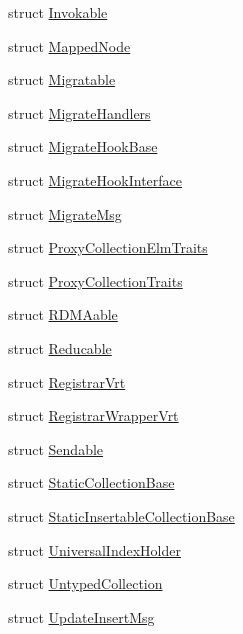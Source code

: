 \begin{DoxyCompactItemize}
\item 
struct \hyperlink{structvt_1_1vrt_1_1collection_1_1_invokable}{Invokable}
\item 
struct \hyperlink{structvt_1_1vrt_1_1collection_1_1_mapped_node}{Mapped\+Node}
\item 
struct \hyperlink{structvt_1_1vrt_1_1collection_1_1_migratable}{Migratable}
\item 
struct \hyperlink{structvt_1_1vrt_1_1collection_1_1_migrate_handlers}{Migrate\+Handlers}
\item 
struct \hyperlink{structvt_1_1vrt_1_1collection_1_1_migrate_hook_base}{Migrate\+Hook\+Base}
\item 
struct \hyperlink{structvt_1_1vrt_1_1collection_1_1_migrate_hook_interface}{Migrate\+Hook\+Interface}
\item 
struct \hyperlink{structvt_1_1vrt_1_1collection_1_1_migrate_msg}{Migrate\+Msg}
\item 
struct \hyperlink{structvt_1_1vrt_1_1collection_1_1_proxy_collection_elm_traits}{Proxy\+Collection\+Elm\+Traits}
\item 
struct \hyperlink{structvt_1_1vrt_1_1collection_1_1_proxy_collection_traits}{Proxy\+Collection\+Traits}
\item 
struct \hyperlink{structvt_1_1vrt_1_1collection_1_1_r_d_m_aable}{R\+D\+M\+Aable}
\item 
struct \hyperlink{structvt_1_1vrt_1_1collection_1_1_reducable}{Reducable}
\item 
struct \hyperlink{structvt_1_1vrt_1_1collection_1_1_registrar_vrt}{Registrar\+Vrt}
\item 
struct \hyperlink{structvt_1_1vrt_1_1collection_1_1_registrar_wrapper_vrt}{Registrar\+Wrapper\+Vrt}
\item 
struct \hyperlink{structvt_1_1vrt_1_1collection_1_1_sendable}{Sendable}
\item 
struct \hyperlink{structvt_1_1vrt_1_1collection_1_1_static_collection_base}{Static\+Collection\+Base}
\item 
struct \hyperlink{structvt_1_1vrt_1_1collection_1_1_static_insertable_collection_base}{Static\+Insertable\+Collection\+Base}
\item 
struct \hyperlink{structvt_1_1vrt_1_1collection_1_1_universal_index_holder}{Universal\+Index\+Holder}
\item 
struct \hyperlink{structvt_1_1vrt_1_1collection_1_1_untyped_collection}{Untyped\+Collection}
\item 
struct \hyperlink{structvt_1_1vrt_1_1collection_1_1_update_insert_msg}{Update\+Insert\+Msg}

\end{DoxyCompactItemize}
